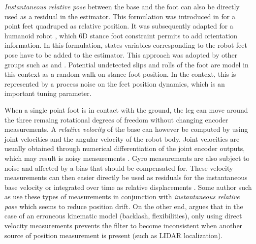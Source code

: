 \textit{Instantaneous relative pose} between the base and the foot can also be directly used as a residual in the estimator. This formulation
was introduced in \cite{bloesch2013state} for a point feet quadruped as relative position. It was subsequently adapted for a humanoid robot \cite{rotella2014state}, 
which 6D stance foot constraint permits to add orientation information. In this formulation, states variables corresponding to the robot feet pose have to 
be added to the estimator. This approach was adopted by other groups such as \cite{hartley2018legged, hartley2018hybrid, hartley2020contact} and \cite{bledt2018cheetah}.
Potential undetected slips and rolls of the foot are model in this context as a random walk on stance foot position. In the \KalmanF context, this is represented 
by a process noise on the feet position dynamics, which is an important tuning parameter.

When a single point foot is in contact with the ground, the leg can move around the three remaing rotational degrees of freedom without changing encoder measurements.
A \textit{relative velocity} of the base can however be computed by using joint velocities and the angular velocity of the robot body. 
Joint velocities are usually obtained through numerical differentiation of the joint encoder outputs, which may result is noisy measurements \cite{rotella2016imu}.
Gyro measurements are also subject to noise and affected by a bias that should be compensated for. These velocity measurements can then easier directly be used as
residuals for the instantaneous base velocity \cite{bloesch2013stateSlippery,bledt2018cheetah} or integrated over time as relative 
displacements \cite{ma2012robust, wisth2020preintegrated}. Some author such as \cite{bloesch2013stateSlippery, bledt2018cheetah} 
use these types of measurements in conjunction with \textit{instantaneous relative pose} which seems to reduce position drift. On the other end,
\cite{fallon2014drift} argues that in the case of an erroneous kinematic model (backlash, flexibilities), only using direct velocity measurements
prevents the filter to become inconsistent when another source of position measurement is present (such as LIDAR localization).  



